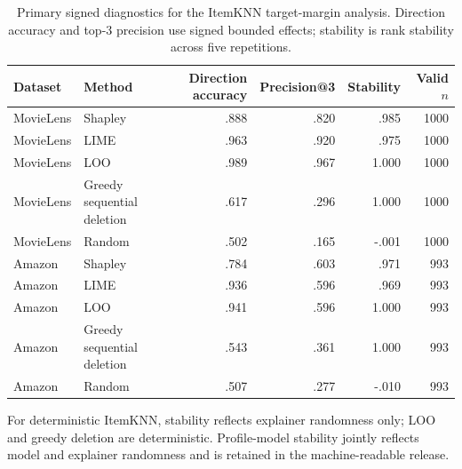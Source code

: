 \begin{table}[t]
\centering\scriptsize
\setlength{\tabcolsep}{3pt}
\caption{Primary signed diagnostics for the ItemKNN target-margin analysis. Direction accuracy and top-$3$ precision use signed bounded effects; stability is rank stability across five repetitions.}
\label{tab:signed-diagnostics}
\begin{tabular}{@{}p{}p{}rrrr@{}}
\toprule
Dataset & Method & Direction accuracy & Precision@3 & Stability & Valid $n$ \\
\midrule
MovieLens & Shapley & .888 & .820 & .985 & 1000 \\
MovieLens & LIME & .963 & .920 & .975 & 1000 \\
MovieLens & LOO & .989 & .967 & 1.000 & 1000 \\
MovieLens & Greedy sequential deletion & .617 & .296 & 1.000 & 1000 \\
MovieLens & Random & .502 & .165 & -.001 & 1000 \\
Amazon & Shapley & .784 & .603 & .971 & 993 \\
Amazon & LIME & .936 & .596 & .969 & 993 \\
Amazon & LOO & .941 & .596 & 1.000 & 993 \\
Amazon & Greedy sequential deletion & .543 & .361 & 1.000 & 993 \\
Amazon & Random & .507 & .277 & -.010 & 993 \\
\bottomrule
\end{tabular}
\end{table}

\noindent For deterministic ItemKNN, stability reflects explainer randomness only; LOO and greedy deletion are deterministic. Profile-model stability jointly reflects model and explainer randomness and is retained in the machine-readable release.

